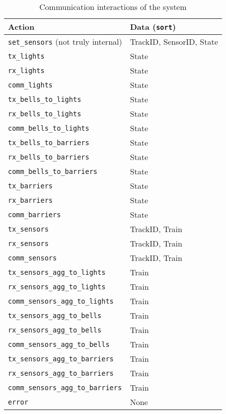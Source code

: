 \documentclass[final]{report}
\begin{document}
\begin{table}[H]
    \centering
    \caption{Communication interactions of the system}
    \label{tab:communication-helpers-actions}
    \begin{tabular}{ll}
        \toprule
        \textbf{Action} & \textbf{Data (\texttt{sort})} \\ 
        \midrule
        \texttt{set\_sensors} (not truly internal) & TrackID, SensorID, State \\
        \midrule
        \texttt{tx\_lights} & State \\
        \texttt{rx\_lights} & State \\
        \texttt{comm\_lights} & State \\
        \texttt{tx\_bells\_to\_lights} & State \\
        \texttt{rx\_bells\_to\_lights} & State \\
        \texttt{comm\_bells\_to\_lights} & State \\
        \texttt{tx\_bells\_to\_barriers} & State \\
        \texttt{rx\_bells\_to\_barriers} & State \\
        \texttt{comm\_bells\_to\_barriers} & State \\
        \texttt{tx\_barriers} & State \\
        \texttt{rx\_barriers} & State \\
        \texttt{comm\_barriers} & State \\
        \midrule
        \texttt{tx\_sensors} & TrackID, Train \\
        \texttt{rx\_sensors} & TrackID, Train \\
        \texttt{comm\_sensors} & TrackID, Train \\
        \midrule
        \texttt{tx\_sensors\_agg\_to\_lights} & Train \\
        \texttt{rx\_sensors\_agg\_to\_lights} & Train \\
        \texttt{comm\_sensors\_agg\_to\_lights} & Train \\
        \texttt{tx\_sensors\_agg\_to\_bells} & Train \\
        \texttt{rx\_sensors\_agg\_to\_bells} & Train \\
        \texttt{comm\_sensors\_agg\_to\_bells} & Train \\
        \texttt{tx\_sensors\_agg\_to\_barriers} & Train \\
        \texttt{rx\_sensors\_agg\_to\_barriers} & Train \\
        \texttt{comm\_sensors\_agg\_to\_barriers} & Train \\
        \midrule
        \texttt{error} & None\\
        \bottomrule
    \end{tabular}
\end{table}
\end{document}
